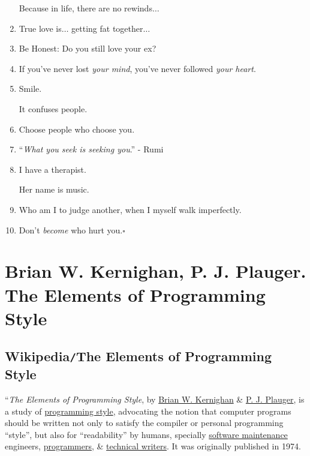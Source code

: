 \documentclass{article}
\begin{document}
\begin{enumerate}
	Because in life, there are no rewinds$\ldots$
	\item True love is$\ldots$ getting fat together$\ldots$
	\item Be Honest: Do you still love your ex?
	\item If you've never lost \textit{your mind}, you've never followed \textit{your heart}.
	\item Smile.
	
	It confuses people.
	\item Choose people who choose you.
	\item ``\textit{What you seek is seeking you}.'' - Rumi
	\item I have a therapist.
	
	Her name is music.
	\item Who am I to judge another, when I myself walk imperfectly.
	\item Don't \textit{become} who hurt you.\hfill$\square$
\end{enumerate}



\section{{\sc Brian W. Kernighan, P. J. Plauger}. The Elements of Programming Style}

\subsection{Wikipedia{\tt/}The Elements of Programming Style}
``{\it The Elements of Programming Style}, by \href{https://en.wikipedia.org/wiki/Brian_W._Kernighan}{Brian W. Kernighan} \& \href{https://en.wikipedia.org/wiki/P._J._Plauger}{P. J. Plauger}, is a study of \href{https://en.wikipedia.org/wiki/Programming_style}{programming style}, advocating the notion that computer programs should be written not only to satisfy the compiler or personal programming ``style'', but also for ``readability'' by humans, specially \href{https://en.wikipedia.org/wiki/Software_maintenance}{software maintenance} engineers, \href{https://en.wikipedia.org/wiki/Programmers}{programmers}, \& \href{https://en.wikipedia.org/wiki/Technical_writers}{technical writers}. It was originally published in 1974.
\end{document}
